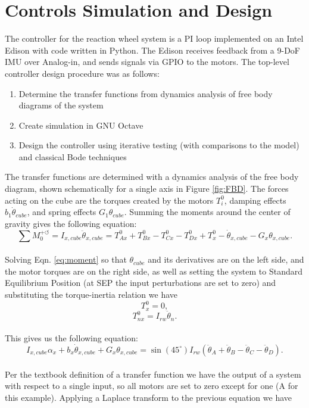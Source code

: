 \documentclass[]{aiaa-tc}%
\begin{document}
\section{Controls Simulation and Design}
The controller for the reaction wheel system is a PI loop implemented on an Intel Edison with code written in Python. The Edison receives feedback from a 9-DoF IMU over Analog-in, and sends signals via GPIO to the motors. The top-level controller design procedure was as follows:
\begin{enumerate}
\item Determine the transfer functions from dynamics analysis of free body diagrams of the system
\item Create simulation in GNU Octave
\item Design the controller using iterative testing (with comparisons to the model) and classical Bode techniques
\end{enumerate}
The transfer functions are determined with a dynamics analysis of the free body diagram, shown schematically for a single axis in Figure \ref{fig:FBD}. The forces acting on the cube are the torques created by the motors $T_i^0$, damping effects $b_1 \dot{\theta}_{cube}$, and spring effects $G_1 \theta_{cube}$. Summing the moments around the center of gravity gives the following equation:\\

\begin{equation}
\label{eq:moment}
\sum M_0^{+ \circlearrowleft} = I_{x,cube} \ddot{\theta}_{x,cube} = T^0_{Ax} + T^0_{Bx} - T^0_{Cx} - T^0_{Dx} + T^0_x - \dot{\theta}_{x,cube} - G_x \theta_{x,cube}.
\end{equation}\\
	
Solving Eqn. \ref{eq:moment} so that $\theta_{cube}$ and its derivatives are on the left side, and the motor torques are on the right side, as well as setting the system to Standard Equilibrium Position (at SEP the input perturbations are set to zero) and substituting the torque-inertia relation we have\\

\[
T^0_x = 0,
\]
\[
T^0_{nx} = I_{rw}\ddot{\theta}_n.\]\\

This gives us the following equation:\\
 
\[
I_{x,cube} \alpha_x + b_x \dot{\theta}_{x,cube} + G_x \theta_{x,cube} = \sin(45^{\circ}) I_{rw} (\ddot{\theta}_A + \ddot{\theta}_B -\ddot{\theta}_C - \ddot{\theta}_D).
\]\\	
Per the textbook definition of a transfer function we have the output of a system with respect to a single input, so all motors are set to zero except for one (A for this example). Applying a Laplace transform to the previous equation we have\\
\end{document}

